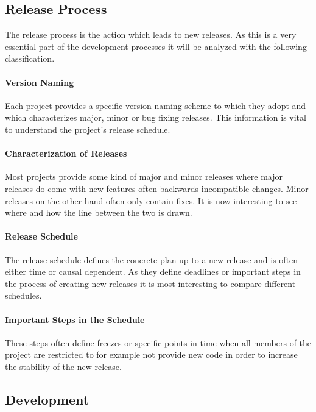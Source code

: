 \subsection{Release Process}

The release process is the action which leads to new releases. As this is a
very essential part of the development processes it will be analyzed with the
following classification.

\paragraph{Version Naming}

Each project provides a specific version naming scheme to which they adopt and
which characterizes major, minor or bug fixing releases. This information is
vital to understand the project's release schedule.

\paragraph{Characterization of Releases}

Most projects provide some kind of major and minor releases where major
releases do come with new features often backwards incompatible changes. Minor
releases on the other hand often only contain fixes. It is now interesting to
see where and how the line between the two is drawn.

\paragraph{Release Schedule}

The release schedule defines the concrete plan up to a new release and is often
either time or causal dependent. As they define deadlines or important steps in
the process of creating new releases it is most interesting to compare
different schedules.

\paragraph{Important Steps in the Schedule}

These steps often define freezes or specific points in time when all members of
the project are restricted to for example not provide new code in order to
increase the stability of the new release.

\subsection{Development}

